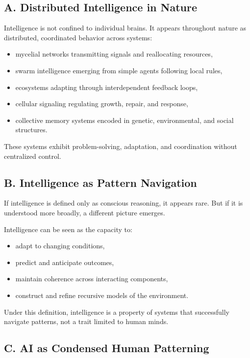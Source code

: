\documentclass[12pt]{article}
\begin{document}
\subsection*{A. Distributed Intelligence in Nature}

Intelligence is not confined to individual brains. It appears throughout nature as distributed, coordinated behavior across systems:

\begin{itemize}
    \item mycelial networks transmitting signals and reallocating resources,
    \item swarm intelligence emerging from simple agents following local rules,
    \item ecosystems adapting through interdependent feedback loops,
    \item cellular signaling regulating growth, repair, and response,
    \item collective memory systems encoded in genetic, environmental, and social structures.
\end{itemize}

These systems exhibit problem-solving, adaptation, and coordination without centralized control.

\subsection*{B. Intelligence as Pattern Navigation}

If intelligence is defined only as conscious reasoning, it appears rare. But if it is understood more broadly, a different picture emerges.

Intelligence can be seen as the capacity to:
\begin{itemize}
    \item adapt to changing conditions,
    \item predict and anticipate outcomes,
    \item maintain coherence across interacting components,
    \item construct and refine recursive models of the environment.
\end{itemize}

Under this definition, intelligence is a property of systems that successfully navigate patterns, not a trait limited to human minds.

\subsection*{C. AI as Condensed Human Patterning}
\end{document}
